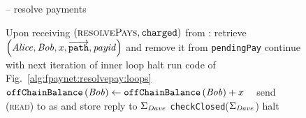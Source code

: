   \begin{figure}[H]
    \begin{systembox}{\fpaynet{} -- resolve payments}
      \begin{algorithmic}[1]
        \State Upon receiving $\left(\textsc{resolvePays},
        \mathtt{charged}\right)$ from \simulator:
        \Indent
              \State retrieve $\left(\mathit{Alice}, \mathit{Bob}, x,
              \overrightarrow{\mathtt{path}}, \mathit{payid}\right)$ and remove
              it from \texttt{pendingPay}
              \If{$\dave{} = \bot$} 
                \State continue with next iteration of inner loop
                \State halt 
                \label{alg:fpaynet:resolvepay:halt:path}
                \State run code of Fig.~\ref{alg:fpaynet:resolvepay:loops}
                \State $\mathtt{offChainBalance}\left(\mathit{Bob}\right) \gets
                \mathtt{offChainBalance}\left(\mathit{Bob}\right) + x$
                \label{alg:fpaynet:resolvepay:corr:credit}
              \Else \ 
                \State send (\textsc{read}) to \ledger{} as \dave{} and store
                reply to $\Sigma_{\mathit{Dave}}$
                \State \texttt{checkClosed}($\Sigma_{\mathit{Dave}}$)
                \label{alg:fpaynet:resolvepay:haltcond:ds}
                  \State halt 
                  \label{alg:fpaynet:resolvepay:halt:ds}
                  \label{alg:fpaynet:resolvepay:haltcond:rel}

\end{algorithmic}
\end{systembox}
\end{figure}

